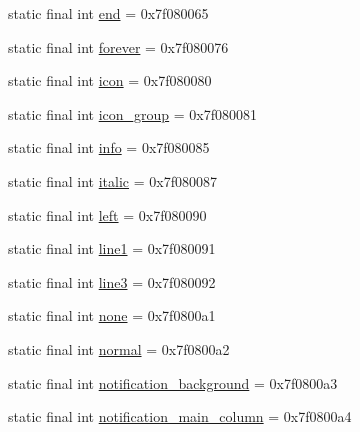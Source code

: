 \begin{DoxyCompactItemize}
\item 
static final int \mbox{\hyperlink{classandroid_1_1support_1_1graphics_1_1drawable_1_1animated_1_1_r_1_1id_a97a84c0ccf58430dd3d033e9739ee640}{end}} = 0x7f080065
\item 
static final int \mbox{\hyperlink{classandroid_1_1support_1_1graphics_1_1drawable_1_1animated_1_1_r_1_1id_a7f28a92791f1cb38de1efdc997a07629}{forever}} = 0x7f080076
\item 
static final int \mbox{\hyperlink{classandroid_1_1support_1_1graphics_1_1drawable_1_1animated_1_1_r_1_1id_a77529580b328ea7aef9b76a6fad610d3}{icon}} = 0x7f080080
\item 
static final int \mbox{\hyperlink{classandroid_1_1support_1_1graphics_1_1drawable_1_1animated_1_1_r_1_1id_a7ae6c60eb608d0fe4c73be06448f5ab1}{icon\+\_\+group}} = 0x7f080081
\item 
static final int \mbox{\hyperlink{classandroid_1_1support_1_1graphics_1_1drawable_1_1animated_1_1_r_1_1id_ae5aa434b06cb587ead5acd71185c5950}{info}} = 0x7f080085
\item 
static final int \mbox{\hyperlink{classandroid_1_1support_1_1graphics_1_1drawable_1_1animated_1_1_r_1_1id_a4fb8020db5e8977280ad64dabf07c71b}{italic}} = 0x7f080087
\item 
static final int \mbox{\hyperlink{classandroid_1_1support_1_1graphics_1_1drawable_1_1animated_1_1_r_1_1id_ac4c8dce2555f05a360d85ff48fdfb8f3}{left}} = 0x7f080090
\item 
static final int \mbox{\hyperlink{classandroid_1_1support_1_1graphics_1_1drawable_1_1animated_1_1_r_1_1id_afa559e41bf985dcd29a2ad25fcbe59f4}{line1}} = 0x7f080091
\item 
static final int \mbox{\hyperlink{classandroid_1_1support_1_1graphics_1_1drawable_1_1animated_1_1_r_1_1id_a73076872a7ca7bf5ba9b576af783624a}{line3}} = 0x7f080092
\item 
static final int \mbox{\hyperlink{classandroid_1_1support_1_1graphics_1_1drawable_1_1animated_1_1_r_1_1id_a4169fd59588f0075ca0925971795c630}{none}} = 0x7f0800a1
\item 
static final int \mbox{\hyperlink{classandroid_1_1support_1_1graphics_1_1drawable_1_1animated_1_1_r_1_1id_acb92b999f9407163a809f311a58cf233}{normal}} = 0x7f0800a2
\item 
static final int \mbox{\hyperlink{classandroid_1_1support_1_1graphics_1_1drawable_1_1animated_1_1_r_1_1id_a996550cf9174057204f5bdd064f2ec4b}{notification\+\_\+background}} = 0x7f0800a3
\item 
static final int \mbox{\hyperlink{classandroid_1_1support_1_1graphics_1_1drawable_1_1animated_1_1_r_1_1id_a33bd9475d425820a04e7cd8b3959dc41}{notification\+\_\+main\+\_\+column}} = 0x7f0800a4

\end{DoxyCompactItemize}
